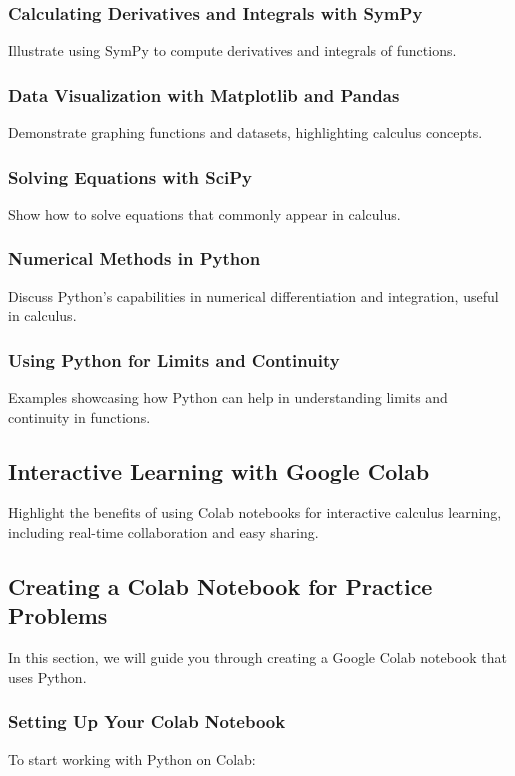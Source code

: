 \documentclass[a4paper,12pt]{book}
\begin{document}
\subsubsection*{Calculating Derivatives and Integrals with SymPy}
Illustrate using SymPy to compute derivatives and integrals of functions.

\subsubsection*{Data Visualization with Matplotlib and Pandas}
Demonstrate graphing functions and datasets, highlighting calculus concepts.

\subsubsection*{Solving Equations with SciPy}
Show how to solve equations that commonly appear in calculus.

\subsubsection*{Numerical Methods in Python}
Discuss Python's capabilities in numerical differentiation and integration, useful in calculus.

\subsubsection*{Using Python for Limits and Continuity}
Examples showcasing how Python can help in understanding limits and continuity in functions.

\subsection*{Interactive Learning with Google Colab}
Highlight the benefits of using Colab notebooks for interactive calculus learning, including real-time collaboration and easy sharing.

\subsection*{Creating a Colab Notebook for Practice Problems}

In this section, we will guide you through creating a Google Colab notebook that uses Python.

\subsubsection*{Setting Up Your Colab Notebook}
To start working with Python on Colab:
\end{document}
